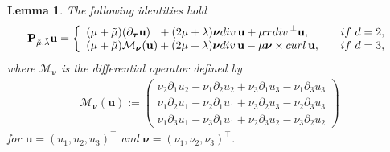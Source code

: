 \documentclass[10pt,a4paper]{amsart}
\newtheorem{lemma}{Lemma}
\newcommand{\curl}{{\rm curl\,}}
\newcommand{\dive}{{\rm div\,}}
\newcommand{\pa}{\partial}
\begin{document}
\begin{lemma}\label{lem2.1}
	The following identities hold 
	\begin{align*}
	\mathbf{P}_{\tilde\mu,\tilde\lambda}\mathbf{u}=
	\left\{
	\begin{array}{ll}
		(\mu+\tilde{\mu})(\pa_{\boldsymbol{\tau}}\mathbf{u})^\perp+(2\mu+\lambda)\boldsymbol{\nu}\dive\mathbf{u}+\mu\boldsymbol{\tau}\dive^\perp\mathbf{u},~~~&{\rm if}~d=2,\\
		(\mu+\tilde{\mu})\mathcal{M}_{\boldsymbol{\nu}}(\mathbf{u})+(2\mu+\lambda)\boldsymbol{\nu}\dive\mathbf{u}-\mu\boldsymbol{\nu}\times\curl\mathbf{u},~~~&{\rm if}~d=3, 
	\end{array}
	\right.
	\end{align*}
	where $\mathcal{M}_{\boldsymbol{\nu}}$ is the differential operator defined by 
	\begin{align*}
	  \mathcal{M}_{\boldsymbol{\nu}}(\mathbf{u}):=
	  \left(
	  \begin{array}{l}
	  	\nu_2\pa_1u_2-\nu_1\pa_2u_2+\nu_3\pa_1u_3-\nu_1\pa_3u_3 \\
	  	\nu_1\pa_2u_1-\nu_2\pa_1u_1+\nu_3\pa_2u_3-\nu_2\pa_3u_3 \\
	  	\nu_1\pa_3u_1-\nu_3\pa_1u_1+\nu_2\pa_3u_2-\nu_3\pa_2u_2
	  \end{array}
	  \right)
	\end{align*}
	for $\mathbf{u}=(u_1,u_2,u_3)^\top$ and $\boldsymbol{\nu}=(\nu_1,\nu_2,\nu_3)^\top$. 
\end{lemma}
\end{document}
